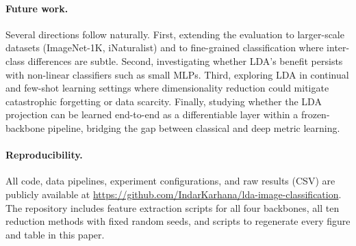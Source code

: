 \paragraph{Future work.} Several directions follow naturally. First, extending the evaluation to larger-scale datasets (ImageNet-1K, iNaturalist) and to fine-grained classification where inter-class differences are subtle. Second, investigating whether LDA's benefit persists with non-linear classifiers such as small MLPs. Third, exploring LDA in continual and few-shot learning settings where dimensionality reduction could mitigate catastrophic forgetting or data scarcity. Finally, studying whether the LDA projection can be learned end-to-end as a differentiable layer within a frozen-backbone pipeline, bridging the gap between classical and deep metric learning.

\paragraph{Reproducibility.} All code, data pipelines, experiment configurations, and raw results (CSV) are publicly available at \url{https://github.com/IndarKarhana/lda-image-classification}. The repository includes feature extraction scripts for all four backbones, all ten reduction methods with fixed random seeds, and scripts to regenerate every figure and table in this paper.
